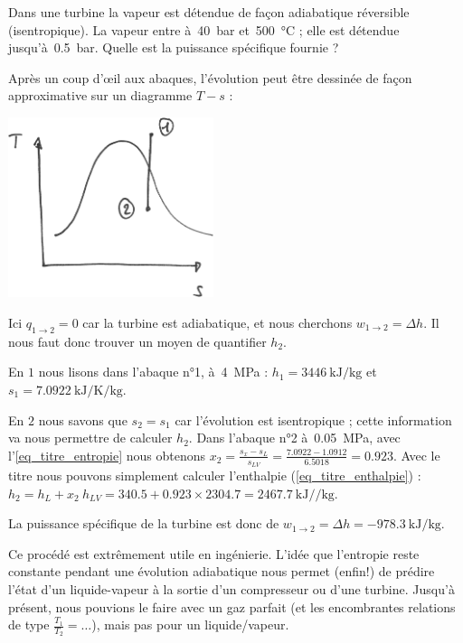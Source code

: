 		
		\begin{anexample}
			Dans une turbine la vapeur est détendue de façon adiabatique réversible (isentropique). La vapeur entre à~\SI{40}{\bar} et~\SI{500}{\degreeCelsius} ; elle est détendue jusqu’à~\SI{0,5}{\bar}. Quelle est la puissance spécifique fournie ?
			
				\begin{answer}
					Après un coup d’œil aux abaques, l’évolution peut être dessinée de façon approximative sur un diagramme $T-s$ :\\
						\begin{center}\includegraphics[width=6cm]{images/ts_example_6.png}\end{center}
				Ici $q_{1\to2} = 0$ car la turbine est adiabatique, et nous cherchons $w_{1\to2} = \Delta h$. Il nous faut donc trouver un moyen de quantifier $h_2$.
				
				En $1$ nous lisons dans l’abaque n°1, à~\SI{4}{\mega\pascal} : $h_1 = \SI{3446}{\kilo\joule\per\kilogram}$ et $s_1 = \SI{7,0922}{\kilo\joule\per\kelvin\per\kilogram}$.
				
				En $2$ nous savons que $s_2 = s_1$ car l’évolution est isentropique ; cette information va nous permettre de calculer $h_2$. Dans l’abaque n°2 à~\SI{0,05}{\mega\pascal}, avec l’\cref{eq_titre_entropie} nous obtenons $x_2 = \frac{s_x - s_L}{s_{LV}} = \frac{\num{7,0922}-\num{1,0912}}{\num{6,5018}} = \num{0,923}$. Avec le titre nous pouvons simplement calculer l’enthalpie (\ref{eq_titre_enthalpie}) : $h_2 = h_L + x_2 \ h_{LV} = \num{340,5} + \num{0,923}\times\num{2304,7} = \SI{2467,7}{\kilo\joule\per\per\kilogram}$.
				
				La puissance spécifique de la turbine est donc de $w_{1\to2} = \Delta h = \SI{-978,3}{\kilo\joule\per\kilogram}$.
				
				\begin{remark}Ce procédé est extrêmement utile en ingénierie. L’idée que l’entropie reste constante pendant une évolution adiabatique nous permet (enfin!) de prédire l’état d’un liquide-vapeur à la sortie d’un compresseur ou d’une turbine. Jusqu’à présent, nous pouvions le faire avec un gaz parfait (et les encombrantes relations de type $\frac{T_1}{T_2} = …$), mais pas pour un liquide/vapeur.\end{remark}\end{answer}
		\end{anexample}


